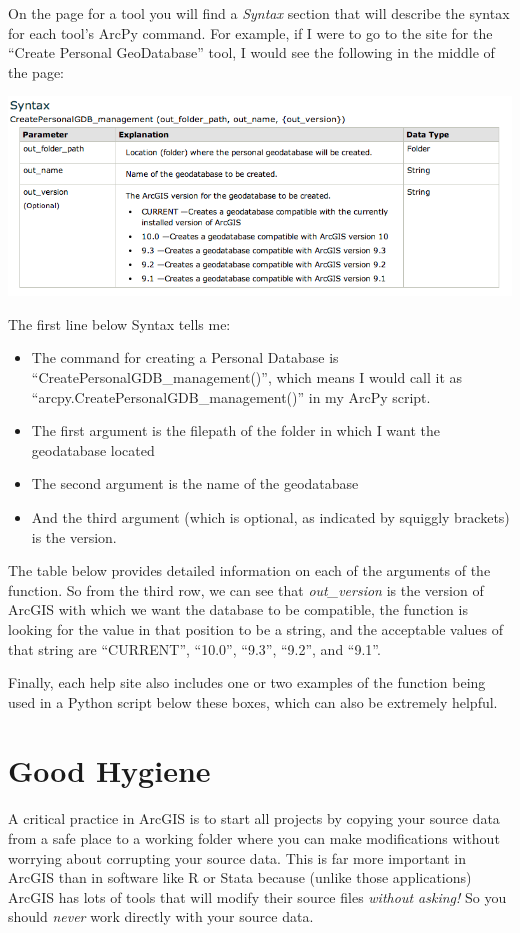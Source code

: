 \documentclass[12pt]{article}
\begin{document}
On the page for a tool you will find a \emph{Syntax} section that will describe the syntax for each tool's ArcPy command. For example, if I were to go to the site for the ``Create Personal GeoDatabase'' tool, I would see the following in the middle of the page: 

\includegraphics[scale=0.5]{figures/helpSyntax.png}

The first line below Syntax tells me: 
\begin{itemize}
	\item The command for creating a Personal Database is ``CreatePersonalGDB\_management()'', which means I would call it as ``arcpy.CreatePersonalGDB\_management()'' in my ArcPy script. 
	\item The first argument is the filepath of the folder in which I want the geodatabase located
	\item The second argument is the name of the geodatabase
	\item And the third argument (which is optional, as indicated by squiggly brackets) is the version. 
\end{itemize}

The table below provides detailed information on each of the arguments of the function. So from the third row, we can see that \emph{out\_version} is the version of ArcGIS with which we want the database to be compatible, the function is looking for the value in that position to be a string, and the acceptable values of that string are ``CURRENT'', ``10.0'', ``9.3'', ``9.2'', and ``9.1''.

Finally, each help site also includes one or two examples of the function being used in a Python script below these boxes, which can also be extremely helpful. 

\section{Good Hygiene}\label{hygiene}
A critical practice in ArcGIS is to start all projects by copying your source data from a safe place to a working folder where you can make modifications without worrying about corrupting your source data. This is far more important in ArcGIS than in software like R or Stata because (unlike those applications) ArcGIS has lots of tools that will modify their source files \emph{without asking!} So you should \emph{never} work directly with your source data. 
\end{document}
